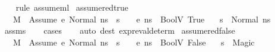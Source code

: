 \begin{isabellebody}
%
\isadelimproof
\ \ %
\endisadelimproof
%
\isatagproof
{}\isamarkupfalse%
\ {\isacharparenleft}{\kern0pt}rule\ assume{\isacharunderscore}{\kern0pt}ml{\isacharparenright}{\kern0pt}%
\endisatagproof
{\isafoldproof}%
%
\isadelimproof
\isanewline
%
\endisadelimproof
\isanewline
{}\isamarkupfalse%
\ assume{\isacharunderscore}{\kern0pt}red{\isacharunderscore}{\kern0pt}true{\isacharcolon}{\kern0pt}\isanewline
\ \ \ {\isachardoublequoteopen}M{\isacharcomma}{\kern0pt}{\isasymLambda}{\isacharcomma}{\kern0pt}{\isasymGamma}{\isacharcomma}{\kern0pt}{\isasymOmega}\ {\isasymturnstile}\ {\isasymlangle}Assume\ e{\isacharcomma}{\kern0pt}\ Normal\ ns{\isasymrangle}\ {\isasymrightarrow}\ s{}{\isachardoublequoteclose}\ \ {\isachardoublequoteopen}{\isasymLambda}{\isacharcomma}{\kern0pt}{\isasymGamma}{\isacharcomma}{\kern0pt}{\isasymOmega}\ {\isasymturnstile}\ {\isasymlangle}e{\isacharcomma}{\kern0pt}\ ns{\isasymrangle}\ {\isasymDown}\ BoolV\ True{\isachardoublequoteclose}\isanewline
\ \ \ {\isachardoublequoteopen}s{}\ {\isacharequal}{\kern0pt}\ Normal\ ns{\isachardoublequoteclose}\isanewline
%
\isadelimproof
\ \ %
\endisadelimproof
%
\isatagproof
{}\isamarkupfalse%
\ assms\isanewline
\ \ \isamarkupfalse%
\ cases\isanewline
\ \ \isamarkupfalse%
\ {\isacharparenleft}{\kern0pt}auto\ dest{\isacharcolon}{\kern0pt}\ expr{\isacharunderscore}{\kern0pt}eval{\isacharunderscore}{\kern0pt}determ{\isacharparenleft}{\kern0pt}{}{\isacharparenright}{\kern0pt}{\isacharparenright}{\kern0pt}%
\endisatagproof
{\isafoldproof}%
%
\isadelimproof
\isanewline
%
\endisadelimproof
\isanewline
{}\isamarkupfalse%
\ assume{\isacharunderscore}{\kern0pt}red{\isacharunderscore}{\kern0pt}false{\isacharcolon}{\kern0pt}\isanewline
\ \ \ {\isachardoublequoteopen}M{\isacharcomma}{\kern0pt}{\isasymLambda}{\isacharcomma}{\kern0pt}{\isasymGamma}{\isacharcomma}{\kern0pt}{\isasymOmega}\ {\isasymturnstile}\ {\isasymlangle}Assume\ e{\isacharcomma}{\kern0pt}\ Normal\ ns{\isasymrangle}\ {\isasymrightarrow}\ s{}{\isachardoublequoteclose}\ \ {\isachardoublequoteopen}{\isasymLambda}{\isacharcomma}{\kern0pt}{\isasymGamma}{\isacharcomma}{\kern0pt}{\isasymOmega}\ {\isasymturnstile}\ {\isasymlangle}e{\isacharcomma}{\kern0pt}\ ns{\isasymrangle}\ {\isasymDown}\ BoolV\ False{\isachardoublequoteclose}\isanewline
\ \ \ {\isachardoublequoteopen}s{}\ {\isacharequal}{\kern0pt}\ Magic{\isachardoublequoteclose}\isanewline

\end{isabellebody}
